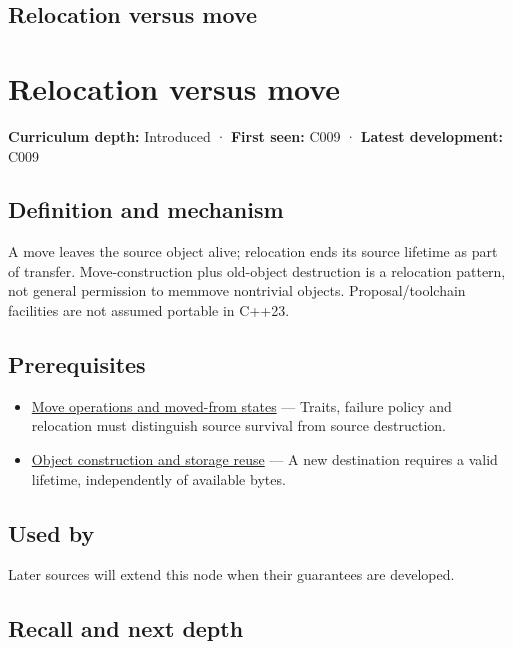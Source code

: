 \hypertarget{appendix-adfd6397af8d}{}
\section*{Relocation versus move}
\chapter{Relocation versus move}\label{appendix-adfd6397af8d-relocation-versus-move}

\textbf{Curriculum depth:} Introduced · \textbf{First seen:} C009 · \textbf{Latest development:} C009

\section{Definition and mechanism}\label{appendix-adfd6397af8d-definition-and-mechanism}

A move leaves the source object alive; relocation ends its source lifetime as part of transfer. Move-construction plus old-object destruction is a relocation pattern, not general permission to memmove nontrivial objects. Proposal/toolchain facilities are not assumed portable in C++23.

\section{Prerequisites}\label{appendix-adfd6397af8d-prerequisites}

\begin{itemize}
\tightlist
\item
  \hyperref[appendix-5636651017c2]{Move operations and moved-from states} --- Traits, failure policy and relocation must distinguish source survival from source destruction.
\item
  \hyperref[appendix-a82f9c438857]{Object construction and storage reuse} --- A new destination requires a valid lifetime, independently of available bytes.
\end{itemize}

\section{Used by}\label{appendix-adfd6397af8d-used-by}

Later sources will extend this node when their guarantees are developed.

\section{Recall and next depth}\label{appendix-adfd6397af8d-recall-and-next-depth}

